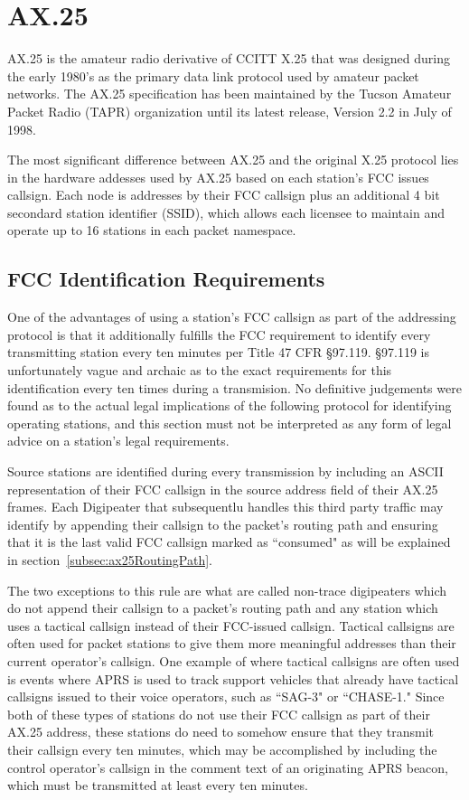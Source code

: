 \chapter{AX.25}

AX.25 is the amateur radio derivative of CCITT X.25 that was designed during the early 1980's 
as the primary data link protocol used by amateur packet networks.
The AX.25 specification has been maintained by the Tucson Amateur Packet Radio (TAPR) 
organization until its latest release, Version 2.2 in July of 1998. 

The most significant difference between AX.25 and the original X.25 protocol lies
in the hardware addesses used by AX.25 based on each station's FCC issues callsign. 
Each node is addresses by their FCC callsign plus an additional 4 bit 
secondard station identifier (SSID), which allows each licensee to maintain and operate 
up to 16 stations in each packet namespace.

\section{FCC Identification Requirements}

One of the advantages of using a station's FCC callsign as part of the addressing protocol
is that it additionally fulfills the FCC requirement to identify every transmitting station
every ten minutes per Title 47 CFR \S97.119. \S97.119 is unfortunately vague and archaic as
to the exact requirements for this identification every ten times during a transmision. No
definitive judgements were found as to the actual legal implications of the following protocol
for identifying operating stations, and this section must not be interpreted as any form of
legal advice on a station's legal requirements.

Source stations are identified during every transmission by including an ASCII representation
of their FCC callsign in the source address field of their AX.25 frames. 
Each Digipeater that subsequentlu handles this third party traffic may identify by appending 
their callsign to the packet's routing path and ensuring that it is the last valid FCC callsign
marked as ``consumed" as will be explained in section~\ref{subsec:ax25RoutingPath}.

The two exceptions to this rule are what are called non-trace digipeaters which do not
append their callsign to a packet's routing path and any station which uses a tactical callsign
instead of their FCC-issued callsign. Tactical callsigns are often used for packet stations to
give them more meaningful addresses than their current operator's callsign. One example of where
tactical callsigns are often used is events where APRS is used to track support vehicles that 
already have tactical callsigns issued to their voice operators, such as ``SAG-3" or ``CHASE-1."
Since both of these types of stations do not use their FCC callsign as part of their AX.25 address,
these stations do need to somehow ensure that they transmit their callsign every ten minutes, which
may be accomplished by including the control operator's callsign in the comment text of an 
originating APRS beacon, which must be transmitted at least every ten minutes.

